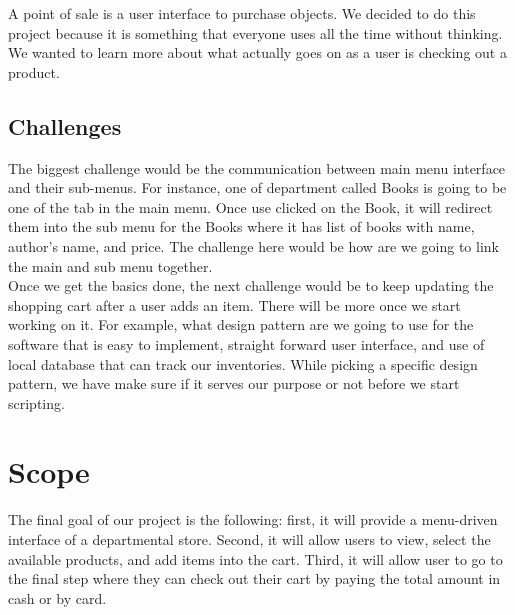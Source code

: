 \documentclass[10pt,conference,onecolumn,compsoc]{IEEEtran}
\begin{document}
A point of sale is a user interface to purchase objects. We decided to do this project because it is something that everyone uses all the time without thinking. We wanted to learn more about what actually goes on as a user is checking out a product.   


\subsection{Challenges}
The biggest challenge would be the communication between main menu interface and their sub-menus. For instance, one of department called Books is going to be one of the tab in the main menu. Once use clicked on the Book, it will redirect them into the sub menu for the Books where it has list of books with name, author's name, and price. The challenge here would be how are we going to link the main and sub menu together. \\

Once we get the basics done, the next challenge would be to keep updating the shopping cart after a user adds an item. There will be more once we start working on it. For example, what design pattern are we going to use for the software that is easy to implement, straight forward user interface, and use of local database that can track our inventories. While picking a specific design pattern, we have make sure if it serves our purpose or not before we start scripting.



\section{Scope}
The final goal of our project is the following: first, it will provide a menu-driven interface of a departmental store. Second, it will allow users to view, select the available products, and add items into the cart. Third, it will allow user to go to the final step where they can check out their cart by paying the total amount in cash or by card. \newline
\end{document}
